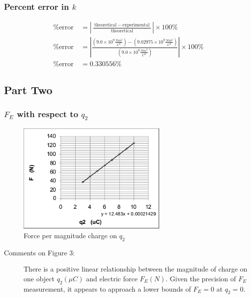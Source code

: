 \documentclass{article}
\begin{document}
\subsubsection{Percent error in $k$}%
\label{ssub:percentag}

\begin{align*}
	\:\text{\% error}\: &= \left| \frac{\:\text{theoretical}\: - \:\text{experimental}\:}{\:\text{theoretical}\:}  \right| \times 100\%\\
\:\text{\% error}\: &= \left|   \frac{\left( 9.0 \times 10^{9} \frac{N m^2}{C^2} \right) - \left( 9.02975 \times 10^{9}\frac{N m^2}{C^2}  \right) }{\left( 9.0 \times 10^{9} \frac{N m^2}{C^2} \right)} \right| \times 100\%\\
\:\text{\% error}\: &= 0.330556 \%
\end{align*}



\subsection{Part Two}%
\label{sub:part_two}



\subsubsection{$F_{E}$ with respect to $q_{2}$}%
\label{ssub:_f__e_with_respect_to_q__2_}

\begin{figure}[H]
	\begin{center}
		\includegraphics[width=0.65\textwidth]{plot3} %
		\caption{Force per magnitude charge on $q_{2}$}
	\end{center}
\end{figure}



\begin{description}
	\item[Comments on Figure 3: ]
		There is a positive linear relationship between the magnitude of charge on one object $q_2 (\mu C)$ and
		electric force $F_{E} (N)$. Given the precision of $F_{E}$ measurement, it appears to approach a
		lower bounds of $F_{E} = 0$ at $q_2 = 0$.
\end{description}
\end{document}
